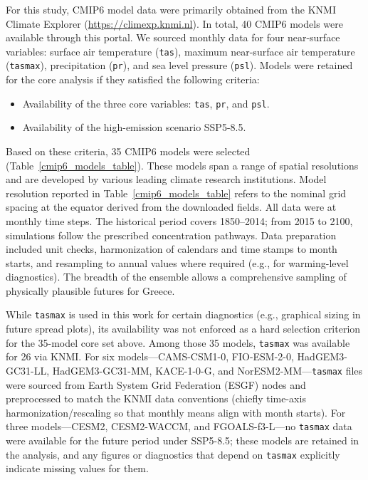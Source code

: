 \documentclass[pdflatex,sn-chicago]{sn-jnl}%
\theoremstyle{thmstyleone}%
\theoremstyle{thmstyletwo}%
\theoremstyle{thmstylethree}%
\begin{document}
For this study, CMIP6 model data were primarily obtained from the KNMI Climate Explorer (\url{https://climexp.knmi.nl}). In total, 40 CMIP6 models were available through this portal. We sourced monthly data for four near-surface variables: surface air temperature (\texttt{tas}), maximum near-surface air temperature (\texttt{tasmax}), precipitation (\texttt{pr}), and sea level pressure (\texttt{psl}). Models were retained for the core analysis if they satisfied the following criteria:
\begin{itemize}
  \item Availability of the three core variables: \texttt{tas}, \texttt{pr}, and \texttt{psl}.%
  \item Availability of the high-emission scenario SSP5-8.5.
\end{itemize}

Based on these criteria, 35 CMIP6 models were selected (Table~\ref{cmip6_models_table}). These models span a range of spatial resolutions and are developed by various leading climate research institutions. Model resolution reported in Table~\ref{cmip6_models_table} refers to the nominal grid spacing at the equator derived from the downloaded fields. All data were at monthly time steps. The historical period covers 1850--2014; from 2015 to 2100, simulations follow the prescribed concentration pathways. Data preparation included unit checks, harmonization of calendars and time stamps to month starts, and resampling to annual values where required (e.g., for warming-level diagnostics). The breadth of the ensemble allows a comprehensive sampling of physically plausible futures for Greece.

While \texttt{tasmax} is used in this work for certain diagnostics (e.g., graphical sizing in future spread plots), its availability was not enforced as a hard selection criterion for the 35-model core set above. Among those 35 models, \texttt{tasmax} was available for 26 via KNMI. For six models---{CAMS-CSM1-0}, {FIO-ESM-2-0}, {HadGEM3-GC31-LL}, {HadGEM3-GC31-MM}, {KACE-1-0-G}, and {NorESM2-MM}---{\texttt{tasmax}} files were sourced from Earth System Grid Federation (ESGF) nodes and preprocessed to match the KNMI data conventions (chiefly time-axis harmonization/rescaling so that monthly means align with month starts). For three models---{CESM2}, {CESM2-WACCM}, and {FGOALS-f3-L}---no \texttt{tasmax} data were available for the future period under SSP5-8.5; these models are retained in the analysis, and any figures or diagnostics that depend on \texttt{tasmax} explicitly indicate missing values for them.
\end{document}

